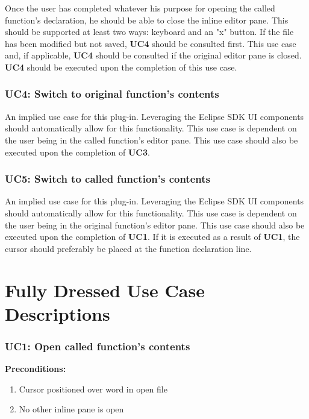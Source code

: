 \documentclass[]{report}
\begin{document}
			Once the user has completed whatever his purpose for opening the called function's declaration, he should be able to close the inline editor pane.  This should be supported at least two ways:  keyboard and an "x" button.  If the file has been modified but not saved, \textbf{UC4} should be consulted first.  This use case and, if applicable, \textbf{UC4} should be consulted if the original editor pane is closed.  \textbf{UC4} should be executed upon the completion of this use case.
			
		\subsubsection{UC4:  Switch to original function's contents}
		
			An implied use case for this plug-in.  Leveraging the Eclipse SDK UI components should automatically allow for this functionality.  This use case is dependent on the user being in the called function's editor pane.   This use case should also be executed upon the completion of \textbf{UC3}.
			
		\subsubsection{UC5:  Switch to called function's contents}
		
			An implied use case for this plug-in.  Leveraging the Eclipse SDK UI components should automatically allow for this functionality.  This use case is dependent on the user being in the original function's editor pane.  This use case should also be executed upon the completion of \textbf{UC1}.  If it is executed as a result of \textbf{UC1}, the cursor should preferably be placed at the function declaration line.
	
	\section{Fully Dressed Use Case Descriptions}
	
		\subsubsection{UC1: Open called function's contents}
		
			\textbf{Preconditions:}
			
				\begin{enumerate}
					
					\item Cursor positioned over word in open file
					
					\item No other inline pane is open
					
				\end{enumerate}
		
\end{document}
